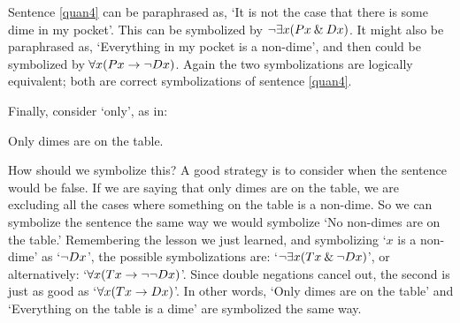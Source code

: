 Sentence \ref{quan4} can be paraphrased as, `It is not the case that there is some dime in my pocket'. This can be symbolized by $\neg\exists x(Px \mathbin{\&} Dx)$. It might also be paraphrased as, `Everything in my pocket is a non-dime', and then could be symbolized by $\forall x(Px \rightarrow \neg Dx)$. Again the two symbolizations are logically equivalent; both are correct symbolizations of sentence \ref{quan4}.


Finally, consider `only', as in:
\begin{earg}
	\item[\ex{quan5}] Only dimes are on the table.
\end{earg}
How should we symbolize this?  A good strategy is to consider when the sentence would be false.  If we are saying that only dimes are on the table, we are excluding all the cases where something on the table is a non-dime.  So we can symbolize the sentence the same way we would symbolize `No non-dimes are on the table.' Remembering the lesson we just learned, and symbolizing `$x$ is a non-dime' as `$\neg \mathord{D}x$', the possible symbolizations are: `$\neg\exists x(\mathord{T}x \mathbin{\&} \neg \mathord{D}x)$', or alternatively: `$\forall x(\mathord{T}x \rightarrow \neg\neg \mathord{D}x)$'. Since double negations cancel out, the second is just as good as `$\forall x(\mathord{T}x \rightarrow \mathord{D}x)$'. In other words, `Only dimes are on the table' and `Everything on the table is a dime' are symbolized the same way.





